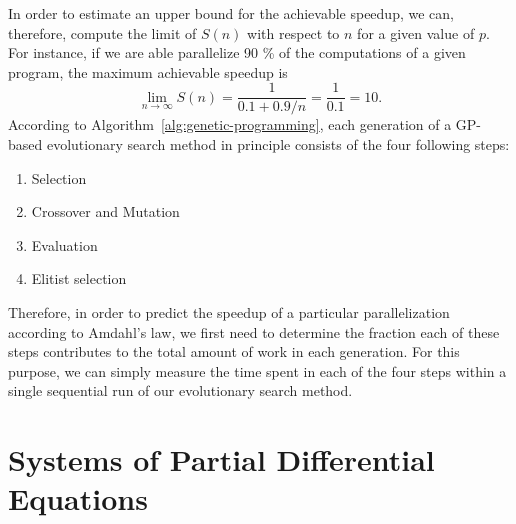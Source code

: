 In order to estimate an upper bound for the achievable speedup, we can, therefore, compute the limit of $S(n)$ with respect to $n$ for a given value of $p$.
For instance, if we are able parallelize 90 \% of the computations of a given program, the maximum achievable speedup is 
\begin{equation}
	\lim\limits_{n \to  \infty} S(n) = \frac{1}{0.1 + 0.9 / n} = \frac{1}{0.1} = 10.
\end{equation}
According to Algorithm~\ref{alg:genetic-programming}, each generation of a GP-based evolutionary search method in principle consists of the four following steps:
\begin{enumerate}
	\item Selection
	\item Crossover and Mutation
	\item Evaluation
	\item Elitist selection
\end{enumerate} 
Therefore, in order to predict the speedup of a particular parallelization according to Amdahl's law, we first need to determine the fraction each of these steps contributes to the total amount of work in each generation.
For this purpose, we can simply measure the time spent in each of the four steps within a single sequential run of our evolutionary search method.



  


\section{Systems of Partial Differential Equations}